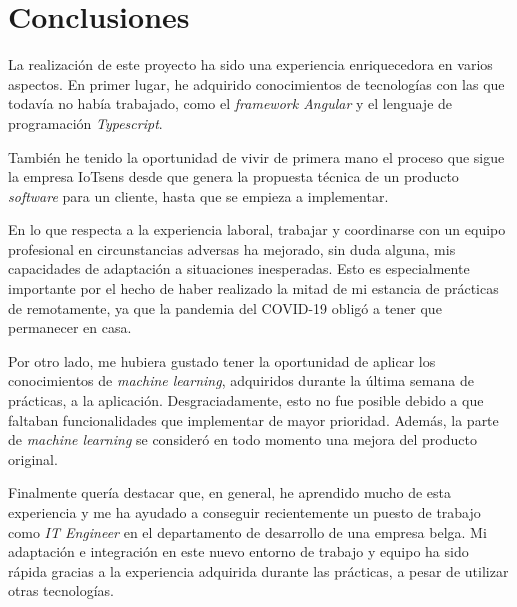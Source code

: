 \documentclass[pdftex,11pt,a4paper]{book}
\begin{document}

\chapter{Conclusiones}

La realización de este proyecto ha sido una experiencia enriquecedora en varios aspectos. En primer lugar, he adquirido conocimientos de tecnologías con las que todavía no había trabajado, como el \textit{framework Angular} y el lenguaje de programación \textit{Typescript}. 

También he tenido la oportunidad de vivir de primera mano el proceso que sigue la empresa IoTsens desde que genera la propuesta técnica de un producto \textit{software} para un cliente, hasta que se empieza a implementar.

En lo que respecta a la experiencia laboral, trabajar y coordinarse con un equipo profesional en circunstancias adversas ha mejorado, sin duda alguna, mis capacidades de adaptación a situaciones inesperadas. Esto es especialmente importante por el hecho de haber realizado la mitad de mi estancia de prácticas de remotamente, ya que la pandemia del COVID-19 obligó a tener que permanecer en casa.

Por otro lado, me hubiera gustado tener la oportunidad de aplicar los conocimientos de \textit{machine learning}, adquiridos durante la última semana de prácticas, a la aplicación. Desgraciadamente, esto no fue posible debido a que faltaban funcionalidades que implementar de mayor prioridad. Además, la parte de \textit{machine learning} se consideró en todo momento una mejora del producto original.

Finalmente quería destacar que, en general, he aprendido mucho de esta experiencia y me ha ayudado a conseguir recientemente un puesto de trabajo como \textit{IT Engineer} en el departamento de desarrollo de una empresa belga. Mi adaptación e integración en este nuevo entorno de trabajo y equipo ha sido rápida gracias a la experiencia adquirida durante las prácticas, a pesar de utilizar otras tecnologías.














\end{document}
